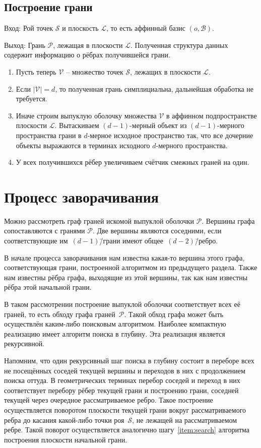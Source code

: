 \documentclass[a4paper,12pt]{article}
\newcommand{\Swarm}{\mathcal{S}} %
\newcommand{\Polyhedron}{\mathcal{P}} %
\newcommand{\Basis}{\mathcal{B}} %
\newcommand{\Viewed}{\mathcal{V}} %
\newcommand{\Plane}{\mathcal{L}} %
\begin{document}
  \subsection{Построение грани}
    \label{subsec:FacetConstruction}

    Вход: Рой точек $\Swarm$ и плоскость $\Plane$, то есть аффинный базис $(o, \Basis)$.

    Выход: Грань $\Polyhedron$, лежащая в плоскости $\Plane$. Полученная структура данных содержит информацию о рёбрах получившейся грани.

    \begin{enumerate}
      \item Пусть теперь $\Viewed$ -- множество точек $\Swarm$, лежащих в плоскости $\Plane$.
      \item Если $|\Viewed| = d$, то полученная грань симплициальна, дальнейшая обработка не требуется.
      \item Иначе строим выпуклую оболочку множества $\Viewed$ в аффинном подпространстве плоскости $\Plane$. Вытаскиваем $(d-1)$-мерный объект из $(d-1)$-мерного пространства грани в $d$-мерное исходное пространство так, что все дочерние объекты выражаются в терминах исходного $d$-мерного пространства.
      \item У всех получившихся рёбер увеличиваем счётчик смежных граней на один.
    \end{enumerate}


\section{Процесс заворачивания}
  Можно рассмотреть граф граней искомой выпуклой оболочки $\Polyhedron$. Вершины графа сопоставляются с гранями $\Polyhedron$. Две вершины являются соседними, если соответствующие им~$(d-1)$\=/грани имеют общее~$(d-2)$\=/ребро.

  В начале процесса заворачивания нам известна какая-то вершина этого графа, соответствующая грани, построенной алгоритмом из предыдущего раздела. Также нам известны рёбра графа, выходящие из этой вершины, так как нам известны рёбра этой начальной грани.

  В таком рассмотрении построение выпуклой оболочки соответствует всех её граней, то есть обходу графа граней~$\Polyhedron$. Такой обход графа может быть осуществлён каким-либо поисковым алгоритмом. Наиболее компактную реализацию имеет алгоритм поиска в глубину. Эта реализация является рекурсивной.

  Напомним, что один рекурсивный шаг поиска в глубину состоит в переборе всех не посещённых соседей текущей вершины и переходов в них с продолжением поиска оттуда. В геометрических терминах перебор соседей и переход в них соответствует перебору рёбер текущей грани и построению грани, соседней текущей через очередное рассматриваемое ребро. Такое построение осуществляется поворотом плоскости текущей грани вокруг рассматриваемого ребра до касания какой-либо точки роя~$\Swarm$, не лежащей на рассматриваемом ребре. Такой поворот осуществляется аналогично шагу~\ref{item:search} алгоритма построения плоскости начальной грани.
\end{document}
